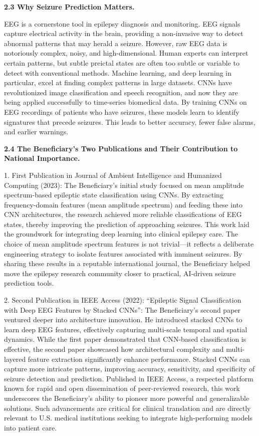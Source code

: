 \documentclass{article}
\begin{document}
{\bf 2.3 Why Seizure Prediction Matters. }

EEG is a cornerstone tool in epilepsy diagnosis and monitoring. EEG signals capture electrical activity in the brain, providing a non-invasive way to detect abnormal patterns that may herald a seizure. However, raw EEG data is notoriously complex, noisy, and high-dimensional. Human experts can interpret certain patterns, but subtle preictal states are often too subtle or variable to detect with conventional methods.
Machine learning, and deep learning in particular, excel at finding complex patterns in large datasets. CNNs have revolutionized image classification and speech recognition, and now they are being applied successfully to time-series biomedical data. By training CNNs on EEG recordings of patients who have seizures, these models learn to identify signatures that precede seizures. This leads to better accuracy, fewer false alarms, and earlier warnings.

{\bf 2.4 The Beneficiary’s Two Publications and Their Contribution to National Importance. }

1. First Publication in Journal of Ambient Intelligence and Humanized Computing (2023):
The Beneficiary’s initial study focused on mean amplitude spectrum-based epileptic state classification using CNNs. By extracting frequency-domain features (mean amplitude spectrum) and feeding these into CNN architectures, the research achieved more reliable classifications of EEG states, thereby improving the prediction of approaching seizures. This work laid the groundwork for integrating deep learning into clinical epilepsy care. The choice of mean amplitude spectrum features is not trivial—it reflects a deliberate engineering strategy to isolate features associated with imminent seizures. By sharing these results in a reputable international journal, the Beneficiary helped move the epilepsy research community closer to practical, AI-driven seizure prediction tools.

2. Second Publication in IEEE Access (2022): “Epileptic Signal Classification with Deep EEG Features by Stacked CNNs”:
The Beneficiary’s second paper ventured deeper into architecture innovation. He introduced stacked CNNs to learn deep EEG features, effectively capturing multi-scale temporal and spatial dynamics. While the first paper demonstrated that CNN-based classification is effective, the second paper showcased how architectural complexity and multi-layered feature extraction significantly enhance performance. Stacked CNNs can capture more intricate patterns, improving accuracy, sensitivity, and specificity of seizure detection and prediction. Published in IEEE Access, a respected platform known for rapid and open dissemination of peer-reviewed research, this work underscores the Beneficiary’s ability to pioneer more powerful and generalizable solutions. Such advancements are critical for clinical translation and are directly relevant to U.S. medical institutions seeking to integrate high-performing models into patient care.
\end{document}
